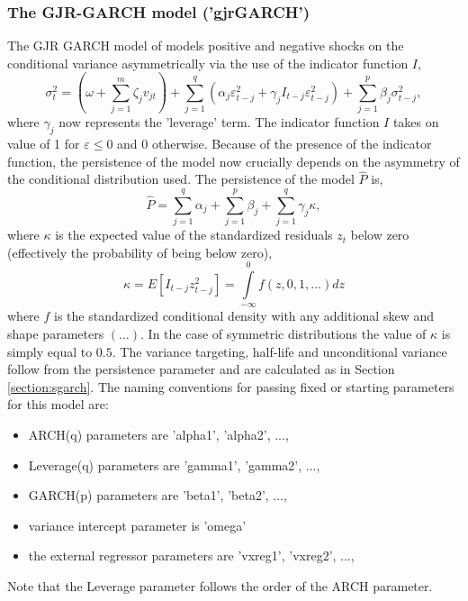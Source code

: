 \subsubsection{The GJR-GARCH model ('gjrGARCH')}\label{section:gjrgarch}
The GJR GARCH model of \cite{Glosten1993} models positive and negative shocks on
the conditional variance asymmetrically via the use of the indicator function $I$,
\begin{equation}\label{eq:gjrgarch}
\sigma _t^2 = \left( {\omega  + \sum\limits_{j = 1}^m {{\zeta _j}{v_{jt}}} } \right) + \sum\limits_{j = 1}^q {\left( {{\alpha _j}\varepsilon _{t - j}^2 + {\gamma _j}{{I}_{t - j}}\varepsilon _{t - j}^2} \right) + } \sum\limits_{j = 1}^p {{\beta _j}\sigma _{t - j}^2},
\end{equation}
where $\gamma_j$ now represents the 'leverage' term. The indicator function $I$
takes on value of 1 for $\varepsilon \le 0$ and 0 otherwise. Because of the
presence of the indicator function, the persistence of the model now crucially
depends on the asymmetry of the conditional distribution used. The persistence
of the model $\hat P$ is,
\begin{equation}\label{eq:gjrgarchp}
\hat P = \sum\limits_{j = 1}^q {{\alpha _j}}  + \sum\limits_{j = 1}^p {{\beta _j} + } \sum\limits_{j = 1}^q {{\gamma _j}\kappa },
\end{equation}
where $\kappa$ is the expected value of the standardized residuals $z_t$ below
zero (effectively the probability of being below zero),
\begin{equation}\label{eq:gjrgarchkappa}
\kappa  = E\left[ {{I_{t - j}}z_{t - j}^2} \right] = \int\limits_{ - \infty }^0 {f\left( {z,0,1,...} \right)dz}
\end{equation}
where $f$ is the standardized conditional density with any additional skew and
shape parameters $(\dots)$. In the case of symmetric distributions the value of
$\kappa$ is simply equal to $0.5$. The variance targeting, half-life and
unconditional variance follow from the persistence parameter and are calculated
as in Section \ref{section:sgarch}.
The naming conventions for passing fixed or starting parameters for this model
are:
\begin{itemize}
\item ARCH(q) parameters are 'alpha1', 'alpha2', ...,
\item Leverage(q) parameters are 'gamma1', 'gamma2', ...,
\item GARCH(p) parameters are 'beta1', 'beta2', ...,
\item variance intercept parameter is 'omega'
\item the external regressor parameters are 'vxreg1', 'vxreg2', ...,
\end{itemize}
Note that the Leverage parameter follows the order of the ARCH parameter.

